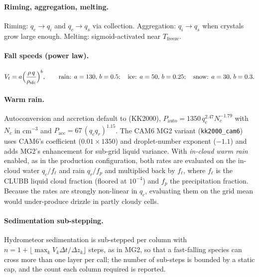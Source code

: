 \documentclass[11pt,twoside]{report}
\begin{document}
\paragraph{Riming, aggregation, melting.}
Riming: $q_{c}\to q_i$ and $q_c\to q_s$ via collection.
Aggregation: $q_i\to q_s$ when crystals grow large enough.
Melting: sigmoid-activated near $T_{\mathrm{freeze}}$.

\paragraph{Fall speeds (power law).}
\begin{equation}
  V_t = a\Bigl(\frac{\rho\,q}{\rho_{\mathrm{sfc}}}\Bigr)^b,
  \qquad \text{rain: } a=130,\,b=0.5;\quad
  \text{ice: } a=50,\,b=0.25;\quad
  \text{snow: } a=30,\,b=0.3.
\end{equation}

\paragraph{Warm rain.}
Autoconversion and accretion default to \citet{KhairoutdinovKogan2000}
(KK2000), $P_{\mathrm{auto}}=1350\,q_c^{2.47}N_c^{-1.79}$ with $N_c$ in
cm$^{-3}$ and $P_{\mathrm{acc}}=67\,(q_cq_r)^{1.15}$.  The CAM6 MG2 variant
(\texttt{kk2000\_cam6}) uses CAM6's coefficient ($0.01\times1350$) and droplet-number exponent ($-1.1$) and adds MG2's enhancement for sub-grid liquid variance.
With \emph{in-cloud warm rain} enabled, as in the production configuration,
both rates are evaluated on the in-cloud water $q_c/f_\ell$ and rain
$q_r/f_p$ and multiplied back by $f_\ell$, where $f_\ell$ is the CLUBB liquid
cloud fraction (floored at $10^{-4}$) and $f_p$ the precipitation fraction.
Because the rates are strongly non-linear in $q_c$, evaluating them on the
grid mean would under-produce drizzle in partly cloudy cells.

\paragraph{Sedimentation sub-stepping.}
Hydrometeor sedimentation is sub-stepped per column with
$n=1+\lfloor\max_k V_k\Delta t/\Delta z_k\rfloor$ steps, as in MG2, so that a
fast-falling species can cross more than one layer per call; the number of
sub-steps is bounded by a static cap, and the count each column required is
reported.
\end{document}
